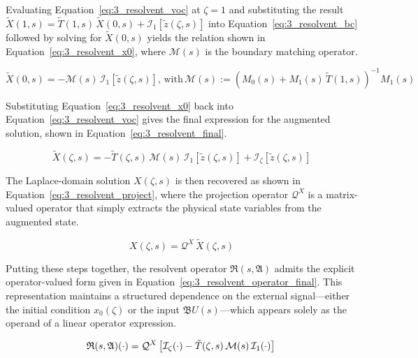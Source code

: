 Evaluating Equation~\eqref{eq:3_resolvent_voc} at $\zeta = 1$ and substituting the result $\tilde{X}(1, s) = \tilde{T}(1, s)\, \tilde{X}(0, s) + \mathcal{I}_1[\tilde{z}(\zeta, s)]$ into Equation~\eqref{eq:3_resolvent_bc} followed by solving for $\tilde{X}(0, s)$ yields the relation shown in Equation~\eqref{eq:3_resolvent_x0}, where $\mathcal{M}(s)$ is the boundary matching operator.

\begin{equation} \label{eq:3_resolvent_x0}
    \tilde{X}(0, s) = -\mathcal{M}(s)\, \mathcal{I}_1[\tilde{z}(\zeta, s)], \, \text{with} \, \mathcal{M}(s) := \left( M_0(s) + M_1(s)\, \tilde{T}(1, s) \right)^{-1} M_1(s)
\end{equation}

Substituting Equation~\eqref{eq:3_resolvent_x0} back into Equation~\eqref{eq:3_resolvent_voc} gives the final expression for the augmented solution, shown in Equation~\eqref{eq:3_resolvent_final}. 

\begin{equation} \label{eq:3_resolvent_final}
\tilde{X}(\zeta, s) = -\tilde{T}(\zeta, s)\, \mathcal{M}(s)\, \mathcal{I}_1[\tilde{z}(\zeta, s)] + \mathcal{I}_\zeta[\tilde{z}(\zeta, s)]
\end{equation}

The Laplace-domain solution $X(\zeta, s)$ is then recovered as shown in Equation~\eqref{eq:3_resolvent_project}, where the projection operator $\mathcal{Q}^X$ is a matrix-valued operator that simply extracts the physical state variables from the augmented state.

\begin{equation} \label{eq:3_resolvent_project}
    X(\zeta, s) = \mathcal{Q}^X\, \tilde{X}(\zeta, s)
\end{equation}

Putting these steps together, the resolvent operator $\mathfrak{R}(s, \mathfrak{A})$ admits the explicit operator-valued form given in Equation~\eqref{eq:3_resolvent_operator_final}. This representation maintains a structured dependence on the external signal—either the initial condition $x_0(\zeta)$ or the input $\mathfrak{B} U(s)$—which appears solely as the operand of a linear operator expression.

\begin{equation} \label{eq:3_resolvent_operator_final}
    \mathfrak{R}(s, \mathfrak{A}) (\cdot) = \mathcal{Q}^X \left[ \mathcal{I}_\zeta (\cdot) - \tilde{T}(\zeta, s)\, \mathcal{M}(s)\, \mathcal{I}_1 (\cdot)  \right] \\
\end{equation}


